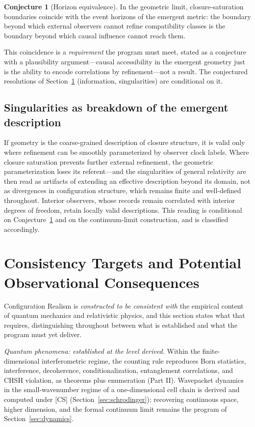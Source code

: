 \documentclass[11pt]{article}
\theoremstyle{definition}
\newtheorem{conjecture}{Conjecture}
\theoremstyle{remark}
\begin{document}
\begin{conjecture}[Horizon equivalence]\label{conj:horizon}
In the geometric limit, closure-saturation boundaries coincide with the event horizons of the emergent metric: the boundary beyond which external observers cannot refine compatibility classes is the boundary beyond which causal influence cannot reach them.
\end{conjecture}

This coincidence is a \emph{requirement} the program must meet, stated as a conjecture with a plausibility argument---causal accessibility in the emergent geometry just is the ability to encode correlations by refinement---not a result. The conjectured resolutions of Section~\ref{sec:targets} (information, singularities) are conditional on it.

\subsection{Singularities as breakdown of the emergent description}
If geometry is the coarse-grained description of closure structure, it is valid only where refinement can be smoothly parameterized by observer clock labels. Where closure saturation prevents further external refinement, the geometric parameterization loses its referent---and the singularities of general relativity are then read as artifacts of extending an effective description beyond its domain, not as divergences in configuration structure, which remains finite and well-defined throughout. Interior observers, whose records remain correlated with interior degrees of freedom, retain locally valid descriptions. This reading is conditional on Conjecture~\ref{conj:horizon} and on the continuum-limit construction, and is classified accordingly.

\section{Consistency Targets and Potential Observational Consequences}\label{sec:targets}
Configuration Realism is \emph{constructed to be consistent with} the empirical content of quantum mechanics and relativistic physics, and this section states what that requires, distinguishing throughout between what is established and what the program must yet deliver.

\emph{Quantum phenomena: established at the level derived.} Within the finite-dimensional interferometric regime, the counting rule reproduces Born statistics, interference, decoherence, conditionalization, entanglement correlations, and CHSH violation, as theorems plus enumeration (Part II). Wavepacket dynamics in the small-wavenumber regime of a one-dimensional cell chain is derived and computed under [CS] (Section~\ref{sec:schrodinger}); recovering continuous space, higher dimension, and the formal continuum limit remains the program of Section~\ref{sec:dynamics}.
\end{document}
